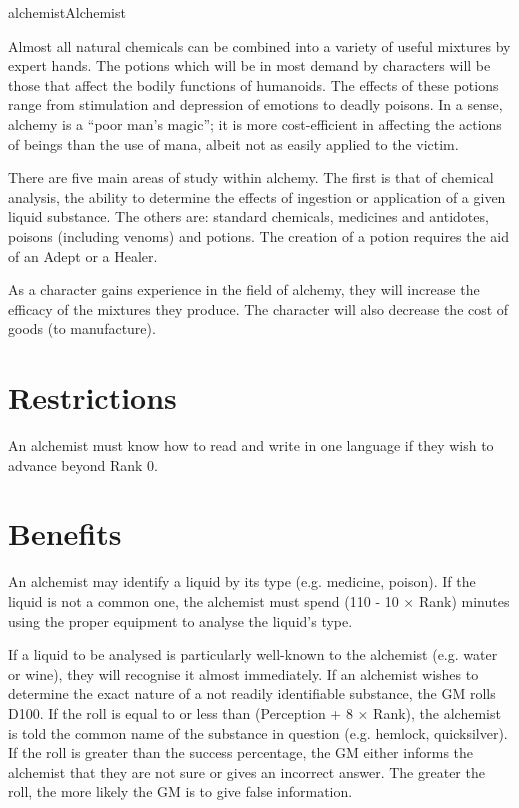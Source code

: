 \begin{Skill}[1.1]{alchemist}{Alchemist}

Almost all natural chemicals can be combined into a variety of useful
mixtures by expert hands.  The potions which will be in most demand by
characters will be those that affect the bodily functions of
humanoids. The effects of these potions range from stimulation and
depression of emotions to deadly poisons.  In a sense, alchemy is a
“poor man’s magic”; it is more cost-efficient in affecting the actions
of beings than the use of mana, albeit not as easily applied to the
victim.

There are five main areas of study within alchemy.  The first is that
of chemical analysis, the ability to determine the effects of
ingestion or application of a given liquid substance.  The others are:
standard chemicals, medicines and antidotes, poisons (including
venoms) and potions.  The creation of a potion requires the aid of an
Adept or a Healer.

As a character gains experience in the field of alchemy, they will
increase the efficacy of the mixtures they produce.  The character
will also decrease the cost of goods (to manufacture).

\section{Restrictions}

An alchemist must know how to read and write in one language if they
wish to advance beyond Rank 0.

\section{Benefits}


An alchemist may identify a liquid by its type (e.g.  medicine,
poison).  If the liquid is not a common one, the alchemist must spend
(110 - 10 × Rank) minutes using the proper equipment to analyse the
liquid’s type.

If a liquid to be analysed is particularly well-known to the alchemist
(e.g.  water or wine), they will recognise it almost immediately.  If
an alchemist wishes to determine the exact nature of a not readily
identifiable substance, the GM rolls D100.  If the roll is equal to or
less than (Perception + 8 × Rank), the alchemist is told the common
name of the substance in question (e.g. hemlock, quicksilver).  If the
roll is greater than the success percentage, the GM either informs the
alchemist that they are not sure or gives an incorrect answer.  The
greater the roll, the more likely the GM is to give false information.


\end{Skill}
